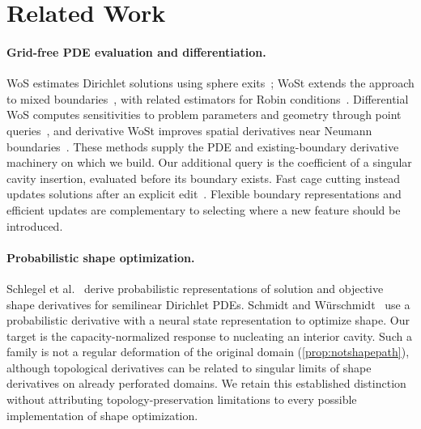 \section{Related Work}
\label{sec:related}

\paragraph{Grid-free PDE evaluation and differentiation.}
WoS estimates Dirichlet solutions using sphere exits~\cite{muller1956some}; WoSt extends the approach to mixed boundaries~\cite{sawhney2023walk}, with related estimators for Robin conditions~\cite{miller2024robin}. Differential WoS computes sensitivities to problem parameters and geometry through point queries~\cite{miller2024differential}, and derivative WoSt improves spatial derivatives near Neumann boundaries~\cite{yu2025robust}. These methods supply the PDE and existing-boundary derivative machinery on which we build. Our additional query is the coefficient of a singular cavity insertion, evaluated before its boundary exists. Fast cage cutting instead updates solutions after an explicit edit~\cite{saeed2026fast}. Flexible boundary representations and efficient updates are complementary to selecting where a new feature should be introduced.

\paragraph{Probabilistic shape optimization.}
Schlegel et al.~\cite{schlegel2026probabilistic} derive probabilistic representations of solution and objective shape derivatives for semilinear Dirichlet PDEs. Schmidt and W\"urschmidt~\cite{schmidt2026first} use a probabilistic derivative with a neural state representation to optimize shape. Our target is the capacity-normalized response to nucleating an interior cavity. Such a family is not a regular deformation of the original domain (\cref{prop:notshapepath}), although topological derivatives can be related to singular limits of shape derivatives on already perforated domains. We retain this established distinction without attributing topology-preservation limitations to every possible implementation of shape optimization.

